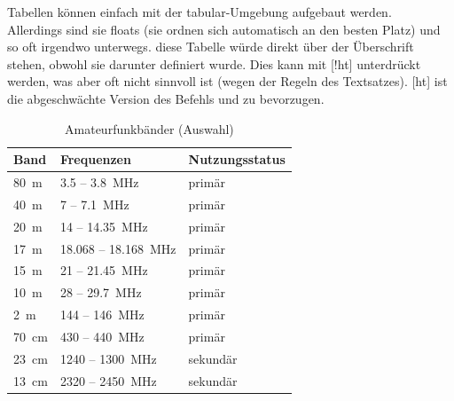 Tabellen können einfach mit der tabular-Umgebung aufgebaut werden.\\
Allerdings sind sie floats (sie ordnen sich automatisch an den besten Platz) und so oft irgendwo unterwegs. diese Tabelle würde direkt über der Überschrift stehen, obwohl sie darunter definiert wurde. Dies kann mit [!ht] unterdrückt werden, was aber oft nicht sinnvoll ist (wegen der Regeln des Textsatzes). [ht] ist die abgeschwächte Version des Befehls und zu bevorzugen.

	\begin{table}[ht]
		\centering
			\begin{tabular}{| l | l | l |} %
					\hline Band & Frequenzen & Nutzungsstatus \\ \hline %
					\SI{80}{m} 	& \num{3,5} -- \SI{3,8}{MHz} 		& primär\\
					\SI{40}{m} 	& \num{7} -- \SI{7,1}{MHz} 			& primär\\
					\SI{20}{m} 	& \num{14} -- \SI{14,35}{MHz}		& primär \\
					\SI{17}{m} 	& \num{18,068} -- \SI{18,168}{MHz} 	& primär\\
					\SI{15}{m} 	& \num{21} -- \SI{21,45}{MHz} 		& primär\\
					\SI{10}{m} 	& \num{28} -- \SI{29,7}{MHz} 		& primär\\
					\SI{2}{m}	& \num{144} -- \SI{146}{MHz} 		& primär\\
					\SI{70}{cm}	& \num{430} -- \SI{440}{MHz}		& primär\\
					\SI{23}{cm}	& \num{1240} -- \SI{1300}{MHz} 		& sekundär\\
					\SI{13}{cm}	& \num{2320} -- \SI{2450}{MHz} 		& sekundär\\
					\hline
			\end{tabular} 
		\caption{Amateurfunkbänder (Auswahl)}
		\label{tab:Bandauswahl}
	\end{table}